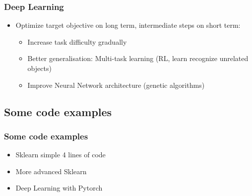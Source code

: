 \begin{frame}\frametitle{Deep Learning}
   \begin{itemize}
      \item Optimize target objective on long term, intermediate steps on short term:
      \begin{itemize}
         \item Increase task difficulty gradually
         \item Better generalisation: Multi-task learning (RL, learn recognize unrelated objects)
         \item Improve Neural Network architecture (genetic algorithms)
      \end{itemize}
   \end{itemize}
\end{frame}


\subsection{Some code examples}

\begin{frame}\frametitle{Some code examples}
   \begin{itemize}
      \item Sklearn simple 4 lines of code
      \item More advanced Sklearn
      \item Deep Learning with Pytorch
   \end{itemize}
\end{frame}



